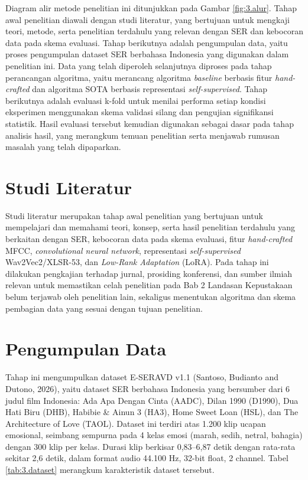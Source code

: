 Diagram alir metode penelitian ini ditunjukkan pada Gambar
\ref{fig:3.alur}. Tahap awal penelitian diawali dengan studi literatur,
yang bertujuan untuk mengkaji teori, metode, serta penelitian terdahulu
yang relevan dengan SER dan kebocoran data pada skema evaluasi. Tahap
berikutnya adalah pengumpulan data, yaitu proses pengumpulan dataset SER
berbahasa Indonesia yang digunakan dalam penelitian ini. Data yang telah
diperoleh selanjutnya diproses pada tahap perancangan algoritma, yaitu
merancang algoritma \emph{baseline} berbasis fitur \emph{hand-crafted} dan algoritma
SOTA berbasis representasi \emph{self-supervised}. Tahap berikutnya adalah evaluasi
k-fold untuk menilai performa setiap kondisi eksperimen menggunakan
skema validasi silang dan pengujian signifikansi statistik. Hasil
evaluasi tersebut kemudian digunakan sebagai dasar pada tahap analisis
hasil, yang merangkum temuan penelitian serta menjawab rumusan masalah
yang telah dipaparkan.

\section{Studi Literatur}
\label{sec:3.2}

Studi literatur merupakan tahap awal penelitian yang bertujuan untuk
mempelajari dan memahami teori, konsep, serta hasil penelitian terdahulu
yang berkaitan dengan SER, kebocoran data pada skema evaluasi, fitur
\emph{hand-crafted} MFCC, \emph{convolutional neural network}, representasi
\emph{self-supervised} Wav2Vec2/XLSR-53, dan \emph{Low-Rank Adaptation}
(LoRA). Pada tahap ini dilakukan pengkajian terhadap jurnal, prosiding
konferensi, dan sumber ilmiah relevan untuk memastikan celah penelitian
pada Bab 2 Landasan Kepustakaan belum terjawab oleh penelitian lain,
sekaligus menentukan algoritma dan skema pembagian data yang sesuai
dengan tujuan penelitian.

\section{Pengumpulan Data}
\label{sec:3.3}

Tahap ini mengumpulkan dataset E-SERAVD v1.1 (Santoso, Budianto and
Dutono, 2026), yaitu dataset SER berbahasa Indonesia yang bersumber dari
6 judul film Indonesia: Ada Apa Dengan Cinta (AADC), Dilan 1990 (D1990),
Dua Hati Biru (DHB), Habibie \& Ainun 3 (HA3), Home Sweet Loan (HSL), dan
The Architecture of Love (TAOL). Dataset ini terdiri atas 1.200 klip
ucapan emosional, seimbang sempurna pada 4 kelas emosi (marah, sedih,
netral, bahagia) dengan 300 klip per kelas. Durasi klip berkisar
0,83--6,87 detik dengan rata-rata sekitar 2,6 detik, dalam format audio
44.100 Hz, 32-bit float, 2 channel. Tabel \ref{tab:3.dataset} merangkum
karakteristik dataset tersebut.


